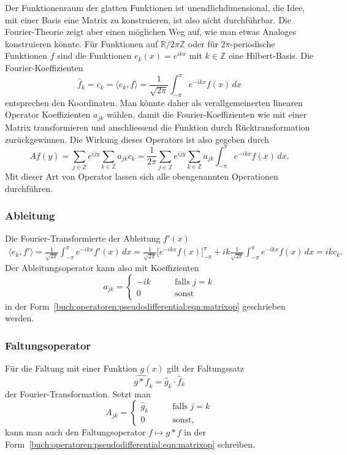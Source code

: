 Der Funktionenraum der glatten Funktionen ist unendlichdimensional, die
Idee, mit einer Basis eine Matrix zu konstruieren, ist also nicht
durchführbar.
Die Fourier-Theorie zeigt aber einen möglichen Weg auf, wie man etwas
Analoges konstruieren könnte.
Für Funktionen auf $\mathbb{R}/2\pi\mathbb{Z}$ oder für $2\pi$-periodische
Funktionen $f$ sind die Funktionen $e_k(x)=e^{ikx}$ mit $k\in\mathbb{Z}$ 
eine Hilbert-Basis.
Die Fourier-Koeffizienten
\[
\hat{f}_k
=
c_k
=
\langle e_k,f\rangle
=
\frac{1}{\!\sqrt{2\pi}}
\int_{-\pi}^{\pi} e^{-ikx}f(x)\,dx
\]
entsprechen den Koordinaten.
Man könnte daher als verallgemeinerten linearen Operator Koeffizienten
$a_{jk}$ wählen, damit die Fourier-Koeffizienten wie mit einer Matrix
transformieren und anschliessend die Funktion durch Rücktransformation
zurückgewinnen.
Die Wirkung dieses Operators ist also gegeben durch
\begin{equation}
Af(y)
=
\sum_{j\in\mathbb{Z}}
e^{ijy}
\sum_{k\in\mathbb{Z}} a_{jk}
c_k
=
\frac{1}{2\pi}
\sum_{j\in\mathbb{Z}}
e^{ijy}
\sum_{k\in\mathbb{Z}} a_{jk}
\int_{-\pi}^\pi e^{-ikx} f(x)\,dx.
\label{buch:operatoren:pseudodifferential:eqn:matrixop}
\end{equation}
Mit dieser Art von Operator lassen sich alle obengenannten Operationen
durchführen.

\subsubsection{Ableitung}
Die Fourier-Transformierte der Ableitung $f'(x)$
\begin{align*}
\langle e_k,f'\rangle
=
\frac{1}{\!\sqrt{2\pi}}
\int_{-\pi}^\pi e^{-ikx}f'(x)\,dx
=
\frac{1}{\!\sqrt{2\pi}}
\biggl[
e^{-ikx}
f(x)
\biggr]_{-\pi}^\pi
+ik
\frac{1}{\!\sqrt{2\pi}}
\int_{-\pi}^\pi e^{-ikx} f(x)\,dx
=
ikc_k.
\end{align*}
Der Ableitungsoperator kann also mit Koeffizienten
\[
a_{jk}
=
\begin{cases}
-ik&\qquad\text{falls $j=k$}\\
0  &\qquad\text{sonst}
\end{cases}
\]
in der Form~\eqref{buch:operatoren:pseudodifferential:eqn:matrixop}
geschrieben werden.

\subsubsection{Faltungsoperator}
Für die Faltung mit einer Funktion $g(x)$ gilt der Faltungssatz
\[
\widehat{g*f}_k
=
\hat{g}_k\cdot \hat{f}_k
\]
der Fourier-Transformation.
Setzt man
\[
A_{jk}
=
\begin{cases}
\hat{g}_k&\qquad\text{falls $j=k$}\\
0        &\qquad\text{sonst,}
\end{cases}
\]
kann man auch den Faltungsoperator $f\mapsto g*f$ in der 
Form~\eqref{buch:operatoren:pseudodifferential:eqn:matrixop}
schreiben.

